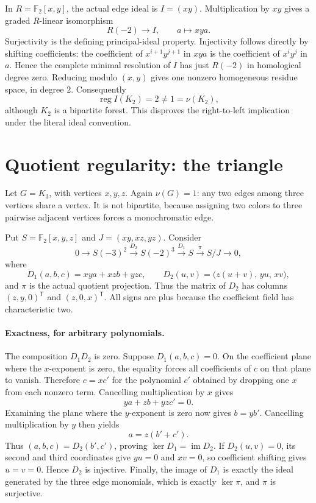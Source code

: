 \documentclass[11pt]{article}
\newcommand{\F}{\mathbb F_2}
\newcommand{\reg}{\operatorname{reg}}
\newcommand{\im}{\operatorname{im}}
\begin{document}
In $R=\F[x,y]$, the actual edge ideal is $I=(xy)$. Multiplication by $xy$ gives a graded $R$-linear isomorphism
\[
 R(-2)\longrightarrow I,\qquad a\longmapsto xya.
\]
Surjectivity is the defining principal-ideal property. Injectivity follows directly by shifting coefficients: the coefficient of $x^{i+1}y^{j+1}$ in $xya$ is the coefficient of $x^iy^j$ in $a$. Hence the complete minimal resolution of $I$ has just $R(-2)$ in homological degree zero. Reducing modulo $(x,y)$ gives one nonzero homogeneous residue space, in degree $2$. Consequently
\[
 \reg I(K_2)=2\ne1=\nu(K_2),
\]
although $K_2$ is a bipartite forest. This disproves the right-to-left implication under the literal ideal convention.

\section{Quotient regularity: the triangle}
Let $G=K_3$, with vertices $x,y,z$. Again $\nu(G)=1$: any two edges among three vertices share a vertex. It is not bipartite, because assigning two colors to three pairwise adjacent vertices forces a monochromatic edge.

Put $S=\F[x,y,z]$ and $J=(xy,xz,yz)$. Consider
\[
 0\longrightarrow S(-3)^2\xrightarrow{D_2}S(-2)^3
 \xrightarrow{D_1}S\xrightarrow{\pi}S/J\longrightarrow0,
\]
where
\[
 D_1(a,b,c)=xya+xzb+yzc,
 \qquad
 D_2(u,v)=\bigl(z(u+v),\,yu,\,xv\bigr),
\]
and $\pi$ is the actual quotient projection. Thus the matrix of $D_2$ has columns $(z,y,0)^{\mathsf T}$ and $(z,0,x)^{\mathsf T}$. All signs are plus because the coefficient field has characteristic two.

\paragraph{Exactness, for arbitrary polynomials.}
The composition $D_1D_2$ is zero. Suppose $D_1(a,b,c)=0$. On the coefficient plane where the $x$-exponent is zero, the equality forces all coefficients of $c$ on that plane to vanish. Therefore $c=xc'$ for the polynomial $c'$ obtained by dropping one $x$ from each nonzero term. Cancelling multiplication by $x$ gives
\[
 ya+zb+yzc'=0.
\]
Examining the plane where the $y$-exponent is zero now gives $b=yb'$. Cancelling multiplication by $y$ then yields
\[
 a=z(b'+c').
\]
Thus $(a,b,c)=D_2(b',c')$, proving $\ker D_1=\im D_2$. If $D_2(u,v)=0$, its second and third coordinates give $yu=0$ and $xv=0$, so coefficient shifting gives $u=v=0$. Hence $D_2$ is injective. Finally, the image of $D_1$ is exactly the ideal generated by the three edge monomials, which is exactly $\ker\pi$, and $\pi$ is surjective.
\end{document}
